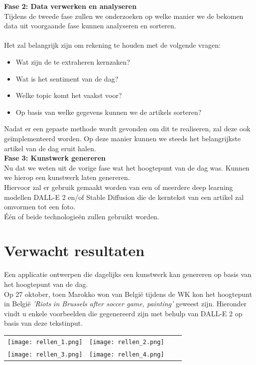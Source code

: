 \noindent
\textbf{Fase 2: Data verwerken en analyseren} \\
Tijdens de tweede fase zullen we onderzoeken op welke manier we de bekomen data uit voorgaande fase kunnen analyseren en sorteren. \\ \\
\noindent
Het zal belangrijk zijn om rekening te houden met de volgende vragen: 
\begin{itemize}
    \item Wat zijn de te extraheren kernzaken?
    \item Wat is het sentiment van de dag? 
    \item Welke topic komt het vaakst voor?
    \item Op basis van welke gegevens kunnen we de artikels sorteren? 
\end{itemize}

\noindent
Nadat er een gepaste methode wordt gevonden om dit te realiseren, zal deze ook geïmplementeerd worden. Op deze manier kunnen we steeds het belangrijkste artikel van de dag eruit halen. \\

\noindent
\textbf{Fase 3: Kunstwerk genereren} \\
Nu dat we weten uit de vorige fase wat het hoogtepunt van de dag was. Kunnen we hierop een kunstwerk laten genereren. \\
Hiervoor zal er gebruik gemaakt worden van een of meerdere deep learning modellen DALL-E 2 en/of Stable Diffusion die de kerntekst van een artikel zal omvormen tot een foto. \\

\noindent
Één of beide technologieën zullen gebruikt worden. 



\section{Verwacht resultaten}%
\label{sec:verwachte_resultaten}
\noindent
Een applicatie ontwerpen die dagelijks een kunstwerk kan genereren op basis van het hoogtepunt van de dag. \\

\noindent
Op 27 oktober, toen Marokko won van België tijdens de WK kon het hoogtepunt in België \emph{'Riots in Brussels after soccer game, painting'} geweest zijn. Hieronder vindt u enkele voorbeelden die gegenereerd zijn met behulp van DALL-E 2 op basis van deze tekstinput. \\


\noindent
\begin{tabular}{llll}
   \texttt{[image: rellen\_1.png]} &
   \texttt{[image: rellen\_2.png]} \\
   \texttt{[image: rellen\_3.png]} &
   \texttt{[image: rellen\_4.png]}
\end{tabular}


